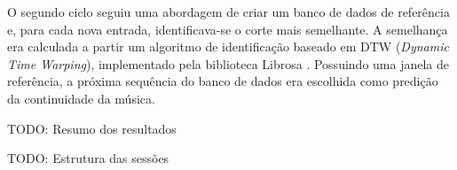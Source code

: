 O segundo ciclo seguiu uma abordagem de criar um banco de dados de referência e, para cada nova entrada, identificava-se o corte mais semelhante. A semelhança era calculada a partir um algoritmo de identificação baseado em DTW (\textit{Dynamic Time Warping})\cite{dtw}, implementado pela biblioteca Librosa \cite{librosa}. Possuindo uma janela de referência, a próxima sequência do banco de dados era escolhida como predição da continuidade da música.

TODO: Resumo dos resultados

TODO: Estrutura das sessões